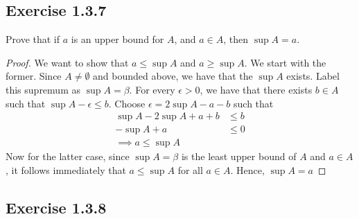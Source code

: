 \subsection{Exercise 1.3.7}

Prove that if \( a \) is an upper bound for \( A \), and \( a \in A \), then \( \sup A = a \).
    

\begin{proof}
    We want to show that \( a \leq \sup A \) and \( a \geq \sup A \). We start with the former. Since \( A \neq \emptyset \) and bounded above, we have that the \( \sup A \) exists. Label this supremum as \( \sup A = \beta \). For every \( \epsilon > 0 \), we have that there exists \( b \in A \) such that \( \sup A - \epsilon \leq b \). Choose \( \epsilon = 2 \sup A  - a - b \) such that 
    \begin{align*}
        \sup A - 2 \sup A + a + b &\leq b \\ 
        -\sup A +  a &\leq  0 \\
       \implies a \leq \sup A    
    \end{align*}
    Now for the latter case, since \( \sup A = \beta \) is the least upper bound of \( A \) and 
    \( a \in A \), it follows immediately that \( a \leq \sup A \) for all \( a \in A\). Hence, \( \sup A = a \)


\end{proof}




\subsection*{Exercise 1.3.8}

